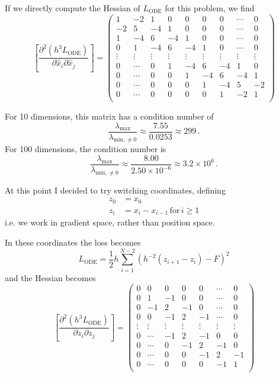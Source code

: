 \documentclass{article}
\begin{document}
If we directly compute the Hessian of $L_{\mathrm{ODE}}$ for this problem, we find
$$
\left[\frac{\partial^2 (h^3 L_{\mathrm{ODE}})}{\partial \hat{x}_i \partial \hat{x}_j} \right] = \begin{pmatrix}
1 & -2 & 1 & 0 & 0 & 0 & 0 & \cdots & 0 \\
-2 & 5 & -4 & 1 & 0 & 0 & 0 & \cdots & 0 \\
1 & -4 & 6 & -4 & 1 & 0 & 0 & \cdots & 0 \\
0 & 1 & -4 & 6 & -4 & 1 & 0 & \cdots & 0 \\
\vdots & \vdots & \vdots & \vdots & \vdots & \vdots & \vdots & \vdots & \vdots \\
0 & \cdots & 0 & 1 & -4 & 6 & -4 & 1 & 0 \\
0 & \cdots & 0 & 0 & 1 & -4 & 6 & -4 & 1 \\
0 & \cdots & 0 & 0 & 0 & 1 & -4 & 5 & -2 \\
0 & \cdots & 0 & 0 & 0 & 0 & 1 & -2 & 1 \\
\end{pmatrix}
$$

For 10 dimensions, this matrix has a condition number of
$$
\frac{\lambda_{\mathrm{max}}}{\lambda_{\mathrm{min}, \ne 0}} \approx \frac{7.55}{0.0253} \approx 299 \,.
$$
For 100 dimensions, the condition number is
$$
\frac{\lambda_{\mathrm{max}}}{\lambda_{\mathrm{min}, \ne 0}} \approx \frac{8.00}{2.50\times 10^{-6}} \approx 3.2 \times 10^6 \,.
$$

At this point I decided to try switching coordinates, defining
\begin{align}
\label{eq:zdef}
z_0 & = x_0 \nonumber \\
z_i & = x_i - x_{i-1} \, \mathrm{for} \, i \ge 1 
\end{align}
i.e. we work in gradient space, rather than position space.

In these coordinates the loss becomes 
$$
L_{\mathrm{ODE}} = \frac{1}{2} h \sum_{i=1}^{N-2} \left( h^{-2}(z_{i+1} - z_i) - F \right)^2 
$$
and the Hessian becomes
$$
\left[\frac{\partial^2 (h^3 L_{\mathrm{ODE}})}{\partial z_i \partial z_j} \right] = \begin{pmatrix}
0 & 0 & 0 & 0 & 0 & \cdots & 0 \\
0 & 1 & -1 & 0 & 0 & \cdots & 0 \\
0 & -1 & 2 & -1 & 0 & \cdots & 0 \\
0 & 0 & -1 & 2 & -1 & \cdots & 0 \\
\vdots & \vdots & \vdots & \vdots & \vdots & \vdots & \vdots \\
0 & \cdots & -1 & 2 & -1 & 0 & 0 \\
0 & \cdots & 0 & -1 & 2 & -1 & 0 \\
0 & \cdots & 0 & 0 & -1 & 2 & -1 \\
0 & \cdots & 0 & 0 & 0 & -1 & 1 \\
\end{pmatrix}
$$
\end{document}
